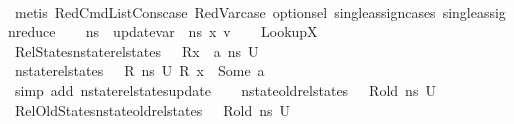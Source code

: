 \begin{isabellebody}
\ \ \ \ \isamarkupfalse%
\ {\isacharparenleft}{\kern0pt}metis\ RedCmdListCons{\isacharunderscore}{\kern0pt}case\ RedVar{\isacharunderscore}{\kern0pt}case\ option{\isachardot}{\kern0pt}sel\ single{\isacharunderscore}{\kern0pt}assign{\isacharunderscore}{\kern0pt}cases\ single{\isacharunderscore}{\kern0pt}assign{\isacharunderscore}{\kern0pt}reduce{\isacharunderscore}{\kern0pt}{}{\isacharparenright}{\kern0pt}\isanewline
\ \ \isamarkupfalse%
\ {\isacharquery}{\kern0pt}ns{\isacharprime}{\kern0pt}\ {\isacharequal}{\kern0pt}\ {\isachardoublequoteopen}{\isacharparenleft}{\kern0pt}update{\isacharunderscore}{\kern0pt}var\ {\isasymLambda}\ ns\ x{}\ v{\isacharparenright}{\kern0pt}{\isachardoublequoteclose}\isanewline
\ \ \isamarkupfalse%
\ LookupX{}{\isacharprime}{\kern0pt}\ \isamarkupfalse%
\ RelStates{\isacharcolon}{\kern0pt}{\isachardoublequoteopen}nstate{\isacharunderscore}{\kern0pt}rel{\isacharunderscore}{\kern0pt}states\ {\isasymLambda}\ {\isasymLambda}{\isacharprime}{\kern0pt}\ {\isacharparenleft}{\kern0pt}R{\isacharparenleft}{\kern0pt}x{}\ {\isasymmapsto}\ a{\isacharparenright}{\kern0pt}{\isacharparenright}{\kern0pt}\ {\isacharquery}{\kern0pt}ns{\isacharprime}{\kern0pt}\ U{}{\isachardoublequoteclose}\isanewline
\ \ \ \ \isamarkupfalse%
\ {\isacartoucheopen}nstate{\isacharunderscore}{\kern0pt}rel{\isacharunderscore}{\kern0pt}states\ {\isasymLambda}\ {\isasymLambda}{\isacharprime}{\kern0pt}\ R\ ns\ U{}{\isacartoucheclose}\ {\isacartoucheopen}R\ x{}{\isacharprime}{\kern0pt}\ {\isacharequal}{\kern0pt}\ Some\ a{\isacartoucheclose}\ \ \ \ \isanewline
\ \ \ \ \isamarkupfalse%
\ {\isacharparenleft}{\kern0pt}simp\ add{\isacharcolon}{\kern0pt}\ nstate{\isacharunderscore}{\kern0pt}rel{\isacharunderscore}{\kern0pt}states{\isacharunderscore}{\kern0pt}update{\isacharunderscore}{\kern0pt}{}{\isacharparenright}{\kern0pt}\isanewline
\ \ \isamarkupfalse%
\ {\isacartoucheopen}nstate{\isacharunderscore}{\kern0pt}old{\isacharunderscore}{\kern0pt}rel{\isacharunderscore}{\kern0pt}states\ {\isasymLambda}\ {\isasymLambda}{\isacharprime}{\kern0pt}\ R{\isacharunderscore}{\kern0pt}old\ ns\ U{}{\isacartoucheclose}\ \isamarkupfalse%
\ RelOldStates{\isacharcolon}{\kern0pt}{\isachardoublequoteopen}nstate{\isacharunderscore}{\kern0pt}old{\isacharunderscore}{\kern0pt}rel{\isacharunderscore}{\kern0pt}states\ {\isasymLambda}\ {\isasymLambda}{\isacharprime}{\kern0pt}\ R{\isacharunderscore}{\kern0pt}old\ {\isacharquery}{\kern0pt}ns{\isacharprime}{\kern0pt}\ U{}{\isachardoublequoteclose}\ \isamarkupfalse%

\end{isabellebody}
